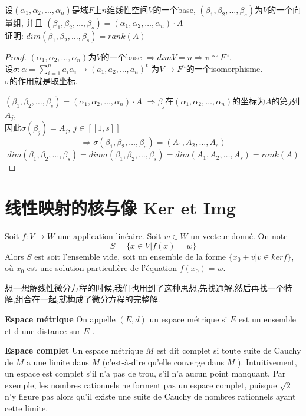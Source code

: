 \documentclass{book}
\begin{document}
\begin{example}
设$(\alpha_1, \alpha_2, \ldots, \alpha_n)$是域$F$上$n$维线性空间$V$的一个base, $(\beta_1, \beta_2, \ldots, \beta_s)$为$V$的一个向量组, 并且
$(\beta_1, \beta_2, \ldots, \beta_s) = (\alpha_1, \alpha_2, \ldots, \alpha_n) \cdot A$ \\
证明: $dim(\beta_1, \beta_2, \ldots, \beta_s) = rank(A)$
\end{example}
\begin{proof}
$(\alpha_1, \alpha_2, \ldots, \alpha_n)$为$V$的一个base $\Rightarrow dimV = n \Rightarrow v \cong F^n$. \\
设$\sigma: \alpha = \sum_{i = 1}^n a_i \alpha_i \rightarrow (a_1, a_2, \ldots, a_n)^t$ 为$V \rightarrow F^n$的一个isomorphisme. \\
$\sigma$的作用就是取坐标.

$(\beta_1, \beta_2, \ldots, \beta_s) = (\alpha_1, \alpha_2, \ldots, \alpha_n) \cdot A$
$\Rightarrow \beta_j$在$(\alpha_1, \alpha_2, \ldots, \alpha_n)$的坐标为$A$的第$j$列$A_j$, \\
因此$\sigma(\beta_j) = A_j,~ j \in [[1, s]]$
$$ \Rightarrow \sigma(\beta_1, \beta_2, \ldots, \beta_s) = (A_1, A_2, \ldots, A_s) $$
$$ dim(\beta_1, \beta_2, \ldots, \beta_s) = dim \sigma(\beta_1, \beta_2, \ldots, \beta_s) = dim(A_1, A_2, \ldots, A_s) = rank(A) $$
\end{proof}

\section{线性映射的核与像 Ker et Img}
\begin{theorem}
Soit $f:V \rightarrow W$ une application lin\'eaire. Soit $w \in W$ un vecteur donn\'e. On note
$$ S=\{x \in V|f(x)=w\} $$
Alors $S$ est soit l'ensemble vide, soit un ensemble de la forme $\{x_0+v|v \in ker f\}$, o\`u $x_0$ est une solution particuli\`ere de l'\'equation $f(x_0)=w$.
\end{theorem}
\begin{note}
想一想解线性微分方程的时候,我们也用到了这种思想,先找通解,然后再找一个特解,组合在一起,就构成了微分方程的完整解.
\end{note}

\textbf{Espace m\'etrique}
On appelle $(E, d)$ un espace m\'etrique si $ E$  est un ensemble et d une distance sur $E$ .

\textbf{Espace complet}
Un espace m\'etrique $ M$  est dit complet si toute suite de Cauchy de $ M$  a une limite dans $ M$  (c'est-\`a-dire qu'elle converge dans $M$ ).\newline
Intuitivement, un espace est complet s'il n'a pas de trou, s'il n'a aucun point manquant. \newline
Par exemple, les nombres rationnels ne forment pas un espace complet,
puisque $\sqrt{2}$ n'y figure pas alors qu'il existe une suite de Cauchy de nombres rationnels ayant cette limite.
\end{document}
